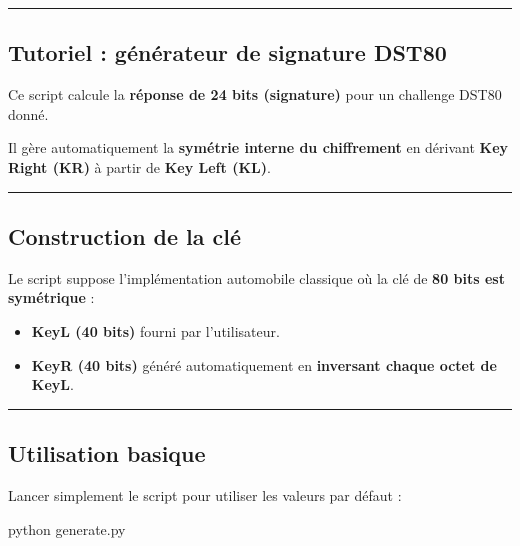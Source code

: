 \documentclass[
  french,
]{article}
\newenvironment{Shaded}{\begin{snugshade}}{\end{snugshade}}
\newcommand{\ExtensionTok}[1]{#1}
\newcommand{\NormalTok}[1]{#1}
\begin{document}
\begin{center}\rule{0.5\linewidth}{0.5pt}\end{center}

\subsection{Tutoriel : générateur de signature
DST80}\label{tutoriel-guxe9nuxe9rateur-de-signature-dst80}

Ce script calcule la \textbf{réponse de 24 bits (signature)} pour un
challenge DST80 donné.

Il gère automatiquement la \textbf{symétrie interne du chiffrement} en
dérivant \textbf{Key Right (KR)} à partir de \textbf{Key Left (KL)}.

\begin{center}\rule{0.5\linewidth}{0.5pt}\end{center}

\subsection{Construction de la clé}\label{construction-de-la-cluxe9}

Le script suppose l'implémentation automobile classique où la clé de
\textbf{80 bits est symétrique} :

\begin{itemize}
\item
  \textbf{KeyL (40 bits)} fourni par l'utilisateur.
\item
  \textbf{KeyR (40 bits)} généré automatiquement en \textbf{inversant
  chaque octet de KeyL}.
\end{itemize}

\begin{center}\rule{0.5\linewidth}{0.5pt}\end{center}

\subsection{Utilisation basique}\label{utilisation-basique}

Lancer simplement le script pour utiliser les valeurs par défaut :

\begin{Shaded}
\begin{Highlighting}[]
\ExtensionTok{python}\NormalTok{ generate.py}
\end{Highlighting}
\end{Shaded}
\end{document}
